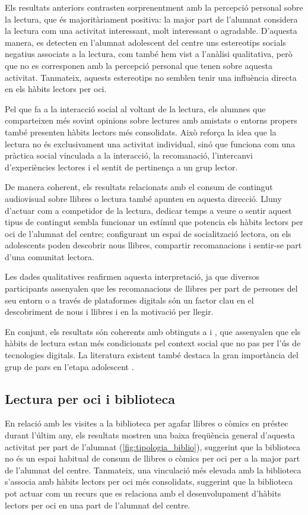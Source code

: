 \documentclass[12pt]{article}
\begin{document}
Els resultats anteriors contrasten sorprenentment amb la percepció personal sobre la lectura, que és majoritàriament positiva: la major part de l'alumnat considera la lectura com una activitat interessant, molt interessant o agradable. D'aquesta manera, es detecten en l'alumnat adolescent del centre uns estereotips socials negatius associats a la lectura, com també hem vist a l'anàlisi qualitativa, però que no es corresponen amb la percepció personal que tenen sobre aquesta activitat. Tanmateix, aquests estereotips no semblen tenir una influència directa en els hàbits lectors per oci.

Pel que fa a la interacció social al voltant de la lectura, els alumnes que comparteixen més sovint opinions sobre lectures amb amistats o entorns propers també presenten hàbits lectors més consolidats. Això reforça la idea que la lectura no és exclusivament una activitat individual, sinó que funciona com una pràctica social vinculada a la interacció, la recomanació, l’intercanvi d’experiències lectores i el sentit de pertinença a un grup lector.

De manera coherent, els resultats relacionats amb el consum de contingut audiovisual sobre llibres o lectura també apunten en aquesta direcció. Lluny d’actuar com a competidor de la lectura, dedicar temps a veure o sentir aquest tipus de contingut sembla funcionar un estímul que potencia els hàbits lectors per oci de l'alumnat del centre; configurant un espai de socialització lectora, on els adolescents poden descobrir nous llibres, compartir recomanacions i sentir-se part d’una comunitat lectora.

Les dades qualitatives reafirmen aquesta interpretació, ja que diversos participants assenyalen que les recomanacions de llibres per part de persones del seu entorn o a través de plataformes digitals són un factor clau en el descobriment de nous i llibres i en la motivació per llegir.

En conjunt, els resultats són coherents amb obtinguts a \textcite{johnsson_bookreading} i \textcite{shutaleva}, que assenyalen que els hàbits de lectura estan més condicionats pel context social que no pas per l’ús de tecnologies digitals. La literatura existent també destaca la gran importància del grup de pars en l'etapa adolescent \parencite{berger}. 

\subsection{Lectura per oci i biblioteca}
En relació amb les visites a la biblioteca per agafar llibres o còmics en préstec durant l’últim any, els resultats mostren una baixa freqüència general d’aquesta activitat per part de l’alumnat (\autoref{fig:tipologia_biblio}), suggerint que la biblioteca no és un espai habitual de consum de llibres o còmics per oci per a la major part de l’alumnat del centre. Tanmateix, una vinculació més elevada amb la biblioteca s’associa amb hàbits lectors per oci més consolidats, suggerint que la biblioteca pot actuar com un recurs que es relaciona amb el desenvolupament d’hàbits lectors per oci en una part de l’alumnat del centre.
\end{document}

